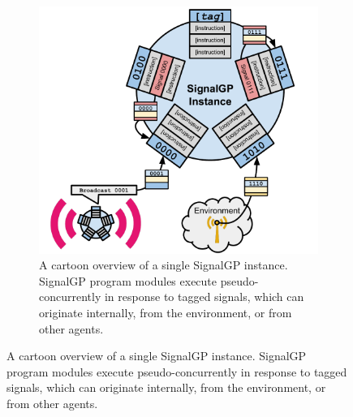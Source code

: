 \begin{figure}
\begin{center}

\hspace*{\fill}%
\begin{minipage}[t]{\columnwidth}
\centering
\vspace{0pt} %
\begin{subfigure}[b]{\textwidth}
\includegraphics[width=\textwidth]{img/signalgp-cartoon}%
\caption{
A cartoon overview of a single SignalGP instance.
SignalGP program modules execute pseudo-concurrently in response to tagged signals, which can originate internally, from the environment, or from other agents.
}
\label{fig:signalgp-cartoon}
\end{subfigure}
\end{minipage}%
\hspace*{\fill}


\end{center}
\end{figure}
